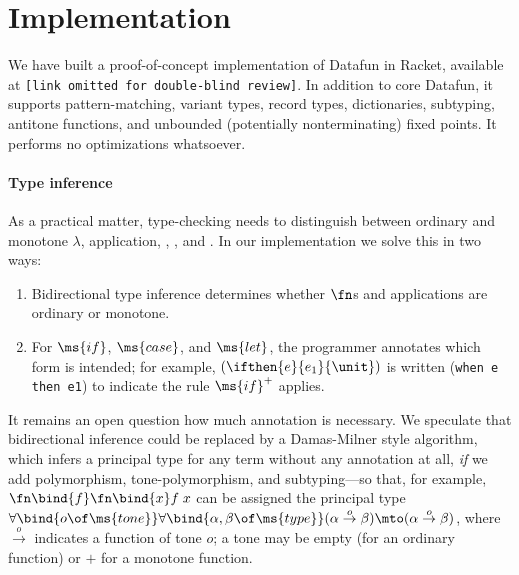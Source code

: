 \section{Implementation}
We have built a proof-of-concept implementation of Datafun in Racket, available
at \texttt{[link omitted for double-blind review]}. In addition to core Datafun,
it supports pattern-matching, variant types, record types, dictionaries,
subtyping, antitone functions, and unbounded (potentially nonterminating) fixed
points. It performs no optimizations whatsoever.

\paragraph{Type inference}
As a practical matter, type-checking needs to distinguish between ordinary and
monotone $\lambda$, application, , , and . In our
implementation we solve this in two ways:
\begin{enumerate}
\item Bidirectional type inference  determines whether $\fn$s and
  applications are ordinary or monotone.
\item For $\ms{if}$, $\ms{case}$, and $\ms{let}$, the programmer annotates which
  form is intended; for example, $(\ifthen{e}{e_1}{\unit})$ is written
  (\texttt{when e then e1}) to indicate the rule $\ms{if}^+$ applies.
\end{enumerate}

It remains an open question how much annotation is necessary. We speculate that
bidirectional inference could be replaced by a Damas-Milner  style
algorithm, which infers a principal type for any term without any annotation at
all, \emph{if} we add polymorphism, tone-polymorphism, and subtyping---so that,
for example, $\fn\bind{f}\fn\bind{x} f\;x$ can be assigned the principal type
$\forall\bind{o\of\ms{tone}}\forall\bind{\alpha,\beta \of \ms{type}} (\alpha
\overset{o}\to \beta) \mto (\alpha \overset{o}\to \beta)$, where
$\overset{o}\to$ indicates a function of tone $o$; a tone may be empty (for an
ordinary function) or ${+}$ for a monotone function.

